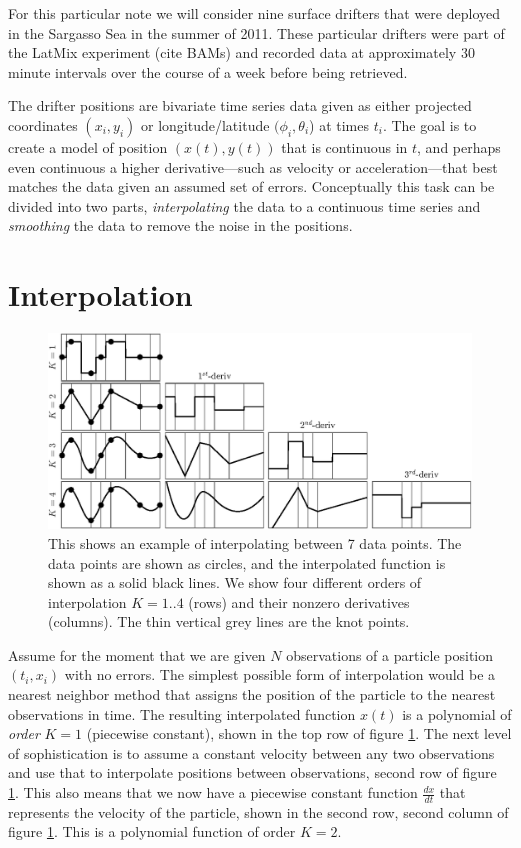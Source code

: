 \documentclass[twocol]{ametsoc}
\begin{document}
For this particular note we will consider nine surface drifters that were deployed in the Sargasso Sea in the summer of 2011. These particular drifters were part of the LatMix experiment (cite BAMs) and recorded data at approximately 30 minute intervals over the course of a week before being retrieved.

The drifter positions are bivariate time series data given as either projected coordinates $(x_i, y_i)$ or longitude/latitude $(\phi_i, \theta_i$) at times $t_i$. The goal is to create a model of position $(x(t),y(t))$ that is continuous in $t$, and perhaps even continuous a higher derivative---such as velocity or acceleration---that best matches the data given an assumed set of errors. Conceptually this task can be divided into two parts, \emph{interpolating} the data to a continuous time series and \emph{smoothing} the data to remove the noise in the positions.

%
\section{Interpolation}
%

\begin{figure}[t]
  \centerline{\includegraphics[width=39pc,angle=0]{interpolation}}
  
  \caption{This shows an example of interpolating between 7 data points. The data points are shown as circles, and the interpolated function is shown as a solid black lines. We show four different orders of interpolation $K=1..4$ (rows) and their nonzero derivatives (columns). The thin vertical grey lines are the knot points.}
  \label{interpolation}
\end{figure}

Assume for the moment that we are given $N$ observations of a particle position $(t_i,x_i)$ with no errors. The simplest possible form of interpolation would be a nearest neighbor method that assigns the position of the particle to the nearest observations in time. The resulting interpolated function $x(t)$ is a polynomial of \emph{order} $K=1$ (piecewise constant), shown in the top row of figure \ref{interpolation}. The next level of sophistication is to assume a constant velocity between any two observations and use that to interpolate positions between observations, second row of figure \ref{interpolation}. This also means that we now have a piecewise constant function $\frac{dx}{dt}$ that represents the velocity of the particle, shown in the second row, second column of figure  \ref{interpolation}. This is a polynomial function of order $K=2$.
\end{document}
